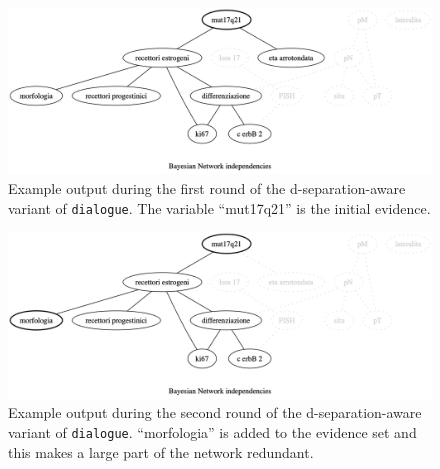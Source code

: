 \begin{figure}[htbp]
\centerline{\includegraphics[width=\columnwidth]{methodology/images/example-d-separation-mpe_1}}
\caption{Example output during the first round of the d-separation-aware variant of \texttt{dialogue}.
	The variable \enquote{mut17q21} is the initial evidence.}
\label{fig:pseudo-mpe-independencies_1}
\end{figure}

\begin{figure}[htbp]
\centerline{\includegraphics[width=\columnwidth]{methodology/images/example-d-separation-mpe_2}}
\caption{Example output during the second round of the d-separation-aware variant of \texttt{dialogue}.
	\enquote{morfologia} is added to the evidence set and this makes a large part of the network redundant.}
\label{fig:pseudo-mpe-independencies_2}
\end{figure}

